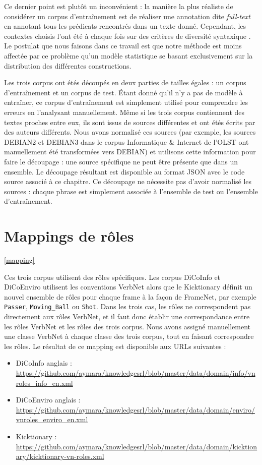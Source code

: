 Ce dernier point est plutôt un inconvénient : la manière la plus réaliste de
considérer un corpus d'entraînement est de réaliser une annotation dite
\textit{full-text} en annotant tous les prédicats rencontrés dans un texte
donné. Cependant, les contextes choisis l'ont été à chaque fois sur des
critères de diversité syntaxique
\citep{schmidt2006interfacing,lhomme2012adding}. Le postulat que nous faisons
dans ce travail est que notre méthode est moins affectée par ce problème qu'un
modèle statistique se basant exclusivement sur la distribution des différentes
constructions.

Les trois corpus ont étés découpés en deux parties de tailles égales : un
corpus d'entraînement et un corpus de test. Étant donné qu'il n'y a pas de
modèle à entraîner, ce corpus d'entraînement est simplement utilisé pour
comprendre les erreurs en l'analysant manuellement. Même si les trois corpus
contiennent des textes proches entre eux, ils sont issus de sources différentes
et ont étés écrits par des auteurs différents. Nous avons normalisé ces sources
(par exemple, les sources DEBIAN2 et DEBIAN3 dans le corpus Informatique \&
Internet de l'OLST ont manuellement été transformées vers DEBIAN) et utilisons
cette information pour faire le découpage : une source spécifique ne peut être
présente que dans un ensemble. Le découpage résultant est disponible au format
JSON avec le code source associé à ce chapitre. Ce découpage ne nécessite pas
d'avoir normalisé les sources : chaque phrase est simplement associée à
l'ensemble de test ou l'ensemble d'entraînement.

\section{Mappings de rôles}
\ref{mapping}

Ces trois corpus utilisent des rôles spécifiques. Les corpus DiCoInfo et
DiCoEnviro utilisent les conventions VerbNet alors que le Kicktionary  définit
un nouvel ensemble de rôles pour chaque frame à la façon de FrameNet, par
exemple \texttt{Passer}, \texttt{Moving\_Ball} ou \texttt{Shot}. Dans les trois
cas, les rôles ne correspondent pas directement aux rôles VerbNet, et il faut
donc établir une correspondance entre les rôles VerbNet et les rôles des trois
corpus.  Nous avons assigné manuellement une classe VerbNet à chaque classe des
trois corpus, tout en faisant correspondre les rôles. Le résultat de ce mapping
est disponible aux URLs suivantes :

\begin{itemize}
    \item DiCoInfo anglais : \url{https://github.com/aymara/knowledgesrl/blob/master/data/domain/info/vnroles_info_en.xml}
    \item DiCoEnviro anglais : \url{https://github.com/aymara/knowledgesrl/blob/master/data/domain/enviro/vnroles_enviro_en.xml}
    \item Kicktionary : \url{https://github.com/aymara/knowledgesrl/blob/master/data/domain/kicktionary/kicktionary-vn-roles.xml}
\end{itemize}

